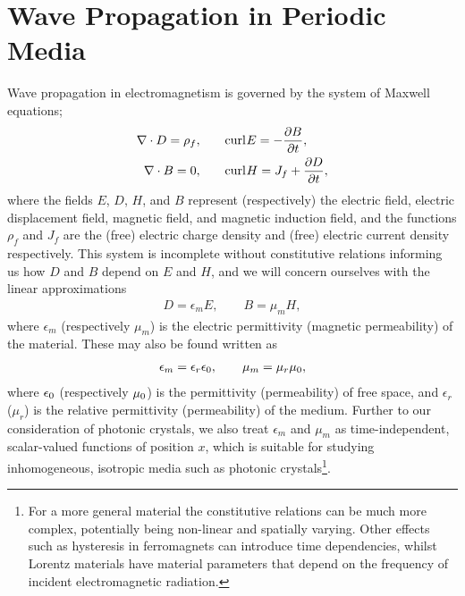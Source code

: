 \section{Wave Propagation in Periodic Media} \label{sec:MathIntro}

Wave propagation in electromagnetism is governed by the system of Maxwell equations; 
\begin{align*}
	\nabla\cdot D = \rho_f, &\qquad
	\mathrm{curl}_{}E = -\dfrac{\partial B}{\partial t}, \\
	\nabla\cdot B = 0, &\qquad
	 \mathrm{curl}_{}H = J_f + \dfrac{\partial D}{\partial t},
\end{align*}
where the fields $E$, $D$, $H$, and $B$ represent (respectively) the electric field, electric displacement field, magnetic field, and magnetic induction field, and the functions $\rho_f$ and $J_f$ are the (free) electric charge density and (free) electric current density respectively.
This system is incomplete without constitutive relations informing us how $D$ and $B$ depend on $E$ and $H$, and we will concern ourselves with the linear approximations
\begin{align*}
	D = \epsilon_m E, \qquad B = \mu_{m}H,
\end{align*}
where $\epsilon_m$ (respectively $\mu_m$) is the electric permittivity (magnetic permeability) of the material.
These may also be found written as
\begin{align*}
	\epsilon_{m} = \epsilon_{r}\epsilon_0, \qquad \mu_{m} = \mu_{r}\mu_0,
\end{align*}
where $\epsilon_0$ (respectively $\mu_0$) is the permittivity (permeability) of free space, and $\epsilon_{r}$ ($\mu_{r}$) is the relative permittivity (permeability) of the medium.
Further to our consideration of photonic crystals, we also treat $\epsilon_m$ and $\mu_m$ as time-independent, scalar-valued functions of position $x$, which is suitable for studying inhomogeneous, isotropic media such as photonic crystals\footnote{For a more general material the constitutive relations can be much more complex, potentially being non-linear and spatially varying. 
Other effects such as hysteresis in ferromagnets can introduce time dependencies, whilst Lorentz materials have material parameters that depend on the frequency of incident electromagnetic radiation.}.
